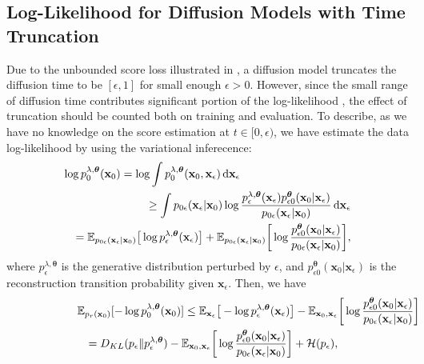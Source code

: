\documentclass{article}
\theoremstyle{definition}
\theoremstyle{remark}
\newcommand*\diff{\mathop{}\!\mathrm{d}}
\begin{document}
	\subsection{Log-Likelihood for Diffusion Models with Time Truncation}
	Due to the unbounded score loss illustrated in \cite{kim2022soft}, a diffusion model truncates the diffusion time to be $[\epsilon,1]$ for small enough $\epsilon>0$. However, since the small range of diffusion time contributes significant portion of the log-likelihood \cite{kim2022soft}, the effect of truncation should be counted both on training and evaluation. To describe, as we have no knowledge on the score estimation at $t\in[0,\epsilon)$, we have estimate the data log-likelihood by using the variational inferecence:
	\begin{eqnarray*}
		\lefteqn{\log{p_{0}^{\lambda,\bm{\theta}}(\mathbf{x}_{0})}=\log{\int p_{0}^{\lambda,\bm{\theta}}(\mathbf{x}_{0},\mathbf{x}_{\epsilon}) \diff\mathbf{x}_{\epsilon}}}&\\
		&&\ge \int p_{0\epsilon}(\mathbf{x}_{\epsilon}\vert\mathbf{x}_{0})\log{\frac{p_{\epsilon}^{\lambda,\bm{\theta}}(\mathbf{x}_{\epsilon})p_{\epsilon 0}^{\bm{\theta}}(\mathbf{x}_{0}\vert\mathbf{x}_{\epsilon})}{p_{0\epsilon}(\mathbf{x}_{\epsilon}\vert\mathbf{x}_{0})}}\diff\mathbf{x}_{\epsilon}\\
		&&=\mathbb{E}_{p_{0\epsilon}(\mathbf{x}_{\epsilon}\vert\mathbf{x}_{0})}\big[\log{p_{\epsilon}^{\lambda,\bm{\theta}}(\mathbf{x}_{\epsilon})}\big]+\mathbb{E}_{p_{0\epsilon}(\mathbf{x}_{\epsilon}\vert\mathbf{x}_{0})}\bigg[\log{\frac{p_{\epsilon 0}^{\bm{\theta}}(\mathbf{x}_{0}\vert\mathbf{x}_{\epsilon})}{p_{0\epsilon}(\mathbf{x}_{\epsilon}\vert\mathbf{x}_{0})}}\bigg],
	\end{eqnarray*}
	where $p_{\epsilon}^{\lambda,\bm{\theta}}$ is the generative distribution perturbed by $\epsilon$, and $p_{\epsilon 0}^{\bm{\theta}}(\mathbf{x}_{0}\vert\mathbf{x}_{\epsilon})$ is the reconstruction transition probability given $\mathbf{x}_{\epsilon}$. Then, we have
	\begin{eqnarray*}
		\lefteqn{\mathbb{E}_{p_{r}(\mathbf{x}_{0})}[-\log{p_{0}^{\lambda,\bm{\theta}}(\mathbf{x}_{0})}]\le\mathbb{E}_{\mathbf{x}_{\epsilon}}\big[-\log{p_{\epsilon}^{\lambda,\bm{\theta}}(\mathbf{x}_{\epsilon})}\big]-\mathbb{E}_{\mathbf{x}_{0},\mathbf{x}_{\epsilon}}\bigg[\log{\frac{p_{\epsilon 0}^{\bm{\theta}}(\mathbf{x}_{0}\vert\mathbf{x}_{\epsilon})}{p_{0\epsilon}(\mathbf{x}_{\epsilon}\vert\mathbf{x}_{0})}}\bigg]}&\\
		&&=D_{KL}(p_{\epsilon}\Vert p_{\epsilon}^{\lambda,\bm{\theta}})-\mathbb{E}_{\mathbf{x}_{0},\mathbf{x}_{\epsilon}}\bigg[\log{\frac{p_{\epsilon 0}^{\bm{\theta}}(\mathbf{x}_{0}\vert\mathbf{x}_{\epsilon})}{p_{0\epsilon}(\mathbf{x}_{\epsilon}\vert\mathbf{x}_{0})}}\bigg]+\mathcal{H}(p_{\epsilon}),
	\end{eqnarray*}
\end{document}
